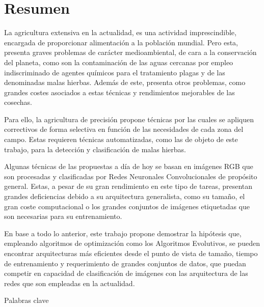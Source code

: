 %
\chapter*{Resumen}
\label{sec:abstract}
\vspace*{-10mm}

La agricultura extensiva en la actualidad, es una actividad imprescindible, encargada de proporcionar alimentación a la población mundial. Pero esta, presenta graves problemas de carácter medioambiental, de cara a la conservación del planeta, como son la contaminación de las aguas cercanas por empleo indiscriminado de agentes químicos para el tratamiento plagas y de las denominadas malas hierbas. Además de este, presenta otros problemas, como grandes costes asociados a estas técnicas y rendimientos mejorables de las cosechas.

Para ello, la agricultura de precisión propone técnicas por las cuales se apliquen correctivos de forma selectiva en función de las necesidades de cada zona del campo. Estas requieren técnicas automatizadas, como las de objeto de este trabajo, para la detección y clasificación de malas hierbas.

Algunas técnicas de las propuestas a día de hoy se basan en imágenes RGB que son procesadas y clasificadas por Redes Neuronales Convolucionales de propósito general. Estas, a pesar de su gran rendimiento en este tipo de tareas, presentan grandes deficiencias debido a su arquitectura generalista, como su tamaño, el gran coste computacional o los grandes conjuntos de imágenes etiquetadas que son necesarias para su entrenamiento.

En base a todo lo anterior, este trabajo propone demostrar la hipótesis que, empleando algoritmos de optimización como los Algoritmos Evolutivos, se pueden encontrar arquitecturas más eficientes desde el punto de vista de tamaño, tiempo de entrenamiento y requerimiento de grandes conjuntos de datos, que puedan competir en capacidad de clasificación de imágenes con las arquitectura de las redes que son empleadas en la actualidad.

\newpage

\vspace*{10mm}

{Palabras clave}\label{sec:palabras-clave} \\ 

